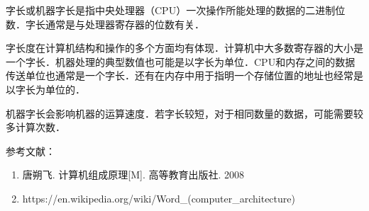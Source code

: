 
字长或机器字长是指中央处理器（CPU）一次操作所能处理的数据的二进制位数．字长通常是与处理器寄存器的位数有关．

字长度在计算机结构和操作的多个方面均有体现．计算机中大多数寄存器的大小是一个字长．机器处理的典型数值也可能是以字长为单位．CPU和内存之间的数据传送单位也通常是一个字长．还有在内存中用于指明一个存储位置的地址也经常是以字长为单位的．

机器字长会影响机器的运算速度．若字长较短，对于相同数量的数据，可能需要较多计算次数．




参考文献：
\begin{enumerate}
\item 唐朔飞. 计算机组成原理[M]. 高等教育出版社. 2008
\item https://en.wikipedia.org/wiki/Word_(computer_architecture)
\end{enumerate}